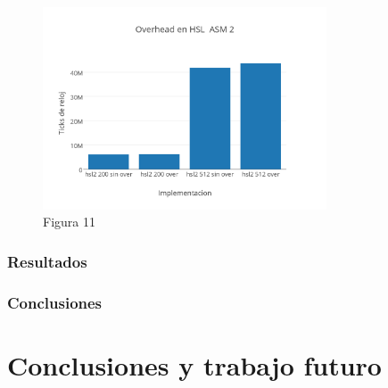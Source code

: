 \documentclass[a4paper]{article}
\begin{document}
\begin{figure}[h]
  \centering
    \includegraphics[width=0.75\textwidth]{imagenes/OverheadEnHSLASM2}
  \caption{Figura 11}
  \label{fig:Overheadhsl}
\end{figure}
 \FloatBarrier

\subsubsection{Resultados}

\subsubsection{Conclusiones}


\newpage
\section{Conclusiones y trabajo futuro}
\end{document}
